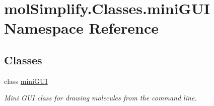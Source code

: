 \hypertarget{namespacemolSimplify_1_1Classes_1_1miniGUI}{}\section{mol\+Simplify.\+Classes.\+mini\+G\+UI Namespace Reference}
\label{namespacemolSimplify_1_1Classes_1_1miniGUI}
\subsection*{Classes}
\begin{DoxyCompactItemize}
\item 
class \hyperlink{classmolSimplify_1_1Classes_1_1miniGUI_1_1miniGUI}{mini\+G\+UI}
\begin{DoxyCompactList}\small\item\em Mini G\+UI class for drawing molecules from the command line. \end{DoxyCompactList}\end{DoxyCompactItemize}

